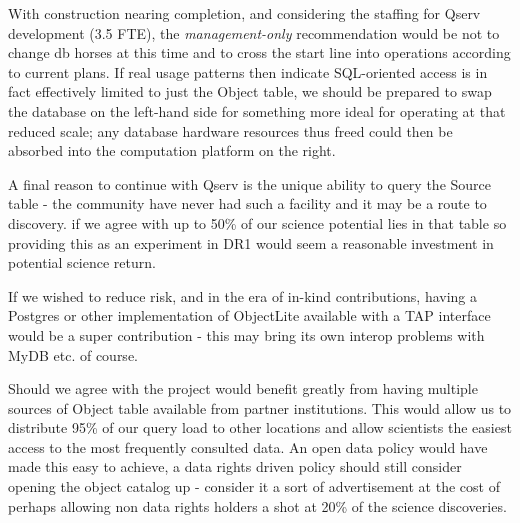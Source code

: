 With construction nearing completion, and considering the staffing for Qserv development (3.5 FTE), the \textit{management-only} recommendation would be not to change db horses at this time and to cross the start line into operations according to current plans.  If real usage patterns then indicate SQL-oriented access is in fact effectively limited to just the Object table, we should be prepared to swap the database on the left-hand side for something more ideal for operating at that reduced scale; any database hardware resources thus freed could then be absorbed into the computation platform on the right.

A final reason to continue with Qserv is the unique ability to query the Source table - the community have never had such a facility and it may be a route to discovery.  if we agree with  up to 50\% of our science potential lies in that table so providing this as an experiment in DR1 would seem a reasonable investment in potential science return.

If we wished to reduce risk, and in the era of in-kind contributions, having a Postgres or other implementation of ObjectLite available with a TAP interface would be a super contribution - this may bring its own interop problems with MyDB etc. of course.

Should we agree with  the project would benefit greatly from having multiple sources of Object table available from partner institutions. This would allow us to distribute 95\% of our query load to other locations and allow scientists the easiest access to the most frequently consulted data.
An open data policy would have made this easy to achieve, a data rights driven policy should still consider opening the object catalog up - consider it a sort of advertisement at the cost of perhaps allowing non data rights holders a shot at 20\% of the science discoveries.


